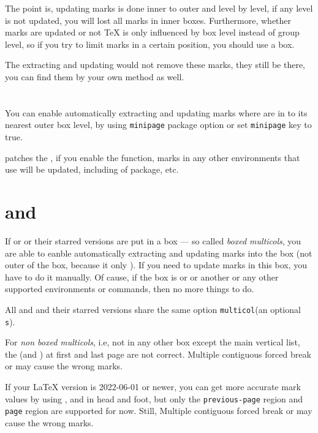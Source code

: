 \documentclass{l3doc}
\begin{document}
The point is, updating marks is done inner to outer and level by level, 
if any level is not updated, you will lost all marks in inner boxes.
Furthermore, whether marks are updated or not {\TeX} is only influenced by box level
instead of group level, so if you try to limit marks in a certain position, you should
use a box.

The extracting and updating would not remove these marks, they still be there, you 
can find them by your own method as well.


\section{}

You can enable automatically extracting and updating marks where are in 
to its nearest outer box level,
by using \texttt{minipage} package option or set \texttt{minipage} key to true.

 patches the , if you enable the function,
marks in any other environments that use  will be updated, 
including  of  package, etc.


\section{ and }

If  or  or their starred versions are put in a box
--- so called \emph{boxed multicols}, you are able to eanble automatically extracting 
and updating marks into the box (not outer of the box, because it only ).
If you need to update marks in this box, you have to do it manually.
Of cause, if the box is  or  or another 
or any other supported environments or commands, then no more things to do.

All  and  and their starred versions share the 
same option \texttt{multicol}(an optional \texttt s).

For \emph{non boxed multicols}, i.e, not in any other box except 
the main vertical list, the  (and ) at first and last page 
are not correct. Multiple contiguous forced break or  may cause the 
wrong marks.

If your {\LaTeX} version is 2022-06-01 or newer,
you can get more accurate mark values by using ,  
and  in head and foot, but only the 
\texttt{previous-page} region and \texttt{page} region are supported for now.
Still, Multiple contiguous forced break or  may cause the wrong marks.
\end{document}
